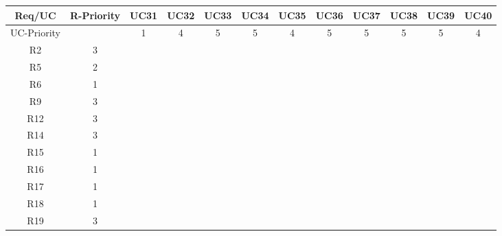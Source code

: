 \documentclass{article}
\begin{document}
\begin{longtable}{|c|c|c|c|c|c|c|c|c|c|c|c|}
	Req/UC      & R-Priority & UC31      & UC32      & UC33      & UC34      & UC35      & UC36      & UC37      & UC38      & UC39      & UC40      \\
	\hline
	UC-Priority &            & 1         & 4         & 5         & 5         & 4         & 5         & 5         & 5         & 5         & 4         \\
	\hline
	R2          & 3          &           &           &           &           &           &           &           &           &           &           \\
	\hline
	R5          & 2          &           &           &           &           &           &           &           &           &           &           \\
	\hline
	R6          & 1          &           &           &           &           &           &           &           &           &           &           \\
	\hline
	R9          & 3          &           &           &           &           &           &           &           &           &           &           \\
	\hline
	R12         & 3          &           &           &           &           &           &           &           &           & \ding{51} &           \\
	\hline
	R14         & 3          &           &           &           &           &           &           &           &           &           &           \\
	\hline
	R15         & 1          &           &           &           &           &           &           &           &           &           &           \\
	\hline
	R16         & 1          &           &           &           &           &           &           &           &           &           &           \\
	\hline
	R17         & 1          &           &           &           &           &           &           &           &           &           &           \\
	\hline
	R18         & 1          &           &           &           &           &           &           &           &           &           &           \\
	\hline
	R19         & 3          &           &           &           &           &           &           &           &           &           &           \\

\end{longtable}
\end{document}
